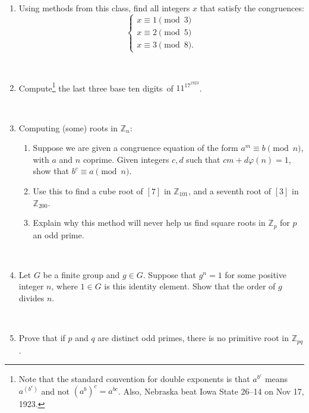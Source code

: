 \documentclass{amsart}
\def\Z{\mathbb Z}
\begin{document}
\begin{enumerate}





\item Using methods from this class, find all integers $x$ that satisfy the congruences:
\[ \begin{cases} 
x \equiv 1 \pmod{3}\\
x \equiv 2 \pmod{5}\\
x \equiv 3 \pmod{8}.
\end{cases}\]

\



\item Compute\footnote{Note that the standard convention for double exponents is that $a^{b^c}$ means $a^{(b^c)}$ and not $(a^b)^c=a^{bc}$. Also, Nebraska beat Iowa State 26--14 on Nov 17, 1923.} the last three base ten digits\ of $11^{17^{1923}}$.

\

\item Computing (some) roots in $\Z_n$:
\begin{enumerate}
\item Suppose we are given a congruence equation of the form $a^m \equiv b \pmod{n}$, with $a$ and $n$ coprime. Given integers $c,d$ such that $cm+d\varphi(n) = 1$, show that
$b^c \equiv a \pmod{n}$.
\item Use this to find a cube root of $[7]$ in $\Z_{101}$, and a seventh root of $[3]$ in $\Z_{200}$.
\item Explain why this method will never help us find square roots in $\Z_p$ for $p$ an odd prime.
\end{enumerate}

\

\item Let $G$ be a finite group and $g\in G$. Suppose that $g^n=1$ for some positive integer $n$, where $1\in G$ is this identity element. Show that the order of $g$ divides $n$.

\

\item Prove that if $p$ and $q$ are distinct odd primes, there is no primitive root in $\Z_{pq}$.

\end{enumerate}
\end{document}
